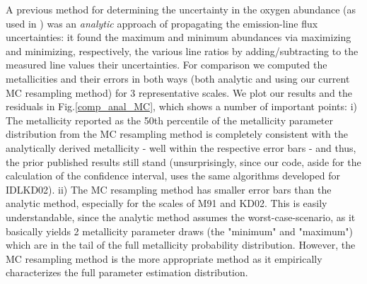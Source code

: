 \documentclass{emulateapj}
\begin{document}
A previous method for determining the uncertainty in the oxygen abundance (as used in \citealt{modjaz08_Z,kewley10,rupke10,modjaz11}) was an \emph{analytic} approach of propagating the emission-line flux uncertainties: it found the maximum and minimum abundances via maximizing and minimizing, respectively, the various line ratios by adding/subtracting to the measured line values their uncertainties. For comparison we computed the metallicities and their errors in both ways (both analytic and using our current MC resampling method) for 3 representative scales. We plot our results and the residuals in Fig.\ref{comp_anal_MC}, which shows a number of important points: i) The metallicity reported as the 50th percentile of the metallicity parameter distribution from the MC resampling method is completely consistent with the analytically derived metallicity -  well within the respective error bars - and thus, the prior published results still stand (unsurprisingly, since our code, aside for the calculation of the confidence interval, uses the same algorithms developed for IDLKD02). ii) The MC resampling method has smaller error bars than the analytic method, especially for the scales of M91 and KD02. This is easily understandable, since the analytic method assumes the worst-case-scenario, as it basically yields 2 metallicity parameter draws (the "minimum" and "maximum") which are in the tail of the full metallicity probability distribution. However, the MC resampling method is the more appropriate method as it empirically characterizes the full parameter estimation distribution.
\end{document}
